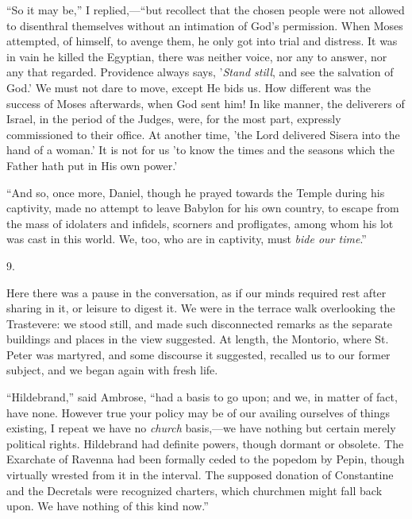 ``So it may be,'' I replied,—``but recollect
that the chosen people were not allowed to disenthral themselves
without an intimation of God's permission. When Moses attempted, of
himself, to avenge them, he only got into trial and distress. It was
in vain he killed the Egyptian, there was neither voice, nor any to
answer, nor any that regarded. Providence always says, '\emph{Stand still},
and see the salvation of God.' We must not dare to move, except He
bids us. How different was the success of Moses afterwards, when God
sent him! In like manner, the deliverers of Israel, in the period
of the Judges, were, for the most part, expressly commissioned to
their office. At another time, 'the Lord delivered Sisera into the
hand of a woman.' It is not for us 'to know the times and the seasons
which the Father hath put in His own power.'

``And so, once more, Daniel, though he prayed
towards the Temple during his captivity, made no attempt to leave
Babylon for his own country, to escape from the mass of idolaters and
infidels, scorners and profligates, among whom his lot was cast in
this world. We, too, who are in captivity, must \emph{bide our time}.''

9.

Here there was a pause in the conversation, as if
our minds required rest after sharing in it, or leisure to digest it.
We were in the terrace walk overlooking the Trastevere: we stood
still, and made such disconnected remarks as the separate buildings
and places in the view suggested. At length, the Montorio, where St.
Peter was martyred, and some discourse it suggested, recalled us to
our former subject, and we began again with fresh life.

``Hildebrand,'' said Ambrose, ``had a basis to go
upon; and we, in matter of fact, have none. However true your policy
may be of our availing ourselves of things existing, I repeat we have
no \emph{church} basis,—we have nothing but certain merely political
rights. Hildebrand had definite powers, though dormant or obsolete.
The Exarchate of Ravenna had been formally ceded to the popedom by
Pepin, though virtually wrested from it in the interval. The supposed
donation of Constantine and the Decretals were recognized charters,
which churchmen might fall back upon. We have nothing of this kind
now.''

